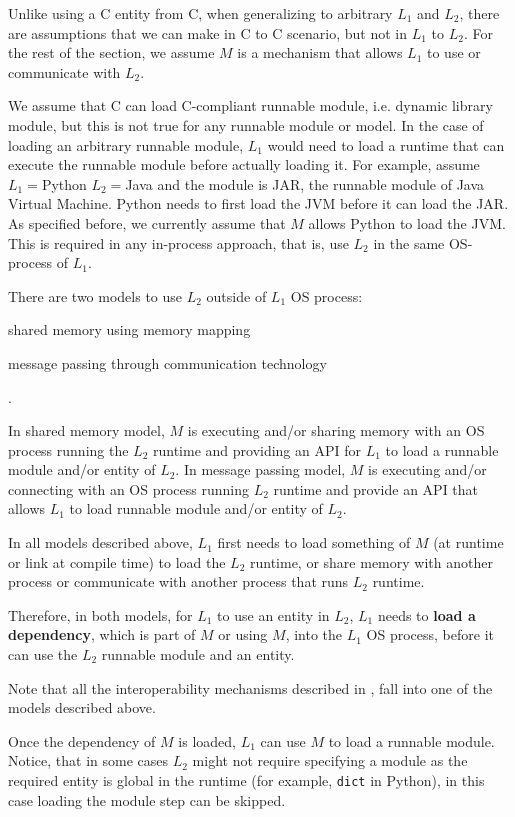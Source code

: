 \documentclass[sigplan,10pt,manuscript,nonacm]{acmart}
\begin{document}
Unlike using a C entity from C, when generalizing to arbitrary $L_1$ and $L_2$, there are assumptions that we can make in C to C scenario, but not in $L_1$ to $L_2$. For the rest of the section, we assume $M$ is a mechanism that allows $L_1$ to use or communicate with $L_2$.

We assume that C can load C-compliant runnable module, i.e. dynamic library module, but this is not true for any runnable module or model. In the case of loading an arbitrary runnable module, $L_1$ would need to load a runtime that can execute the runnable module before actually loading it. For example, assume $L_1=$Python $L_2=$Java and the module is JAR, the runnable module of Java Virtual Machine. Python needs to first load the JVM before it can load the JAR. As specified before, we currently assume that $M$ allows Python to load the JVM. This is required in any in-process approach, that is, use $L_2$ in the same OS-process of $L_1$.

There are two models to use $L_2$ outside of $L_1$ OS process: 
\begin{enumerate*}
\item shared memory using memory mapping
\item message passing through communication technology 
\end{enumerate*}.

In shared memory model, $M$ is executing and/or sharing memory with an OS process running the $L_2$ runtime and providing an API for $L_1$ to load a runnable module and/or entity of $L_2$. In message passing model, $M$ is executing and/or connecting with an OS process running $L_2$ runtime and provide an API that allows $L_1$ to load runnable module and/or entity of $L_2$. 

In all models described above, $L_1$ first needs to load something of $M$ (at runtime or link at compile time) to load the $L_2$ runtime, or share memory with another process or communicate with another process that runs $L_2$ runtime.

Therefore, in both models, for $L_1$ to use an entity in $L_2$, $L_1$ needs to \textbf{load a dependency}, which is part of $M$ or using $M$, into the $L_1$ OS process, before it can use the $L_2$ runnable module and an entity.

Note that all the interoperability mechanisms described in \cite{empirical_multi_lingual} \cite{toward_description_of_interop} \cite{polyfax}, fall into one of the models described above.

Once the dependency of $M$ is loaded, $L_1$ can use $M$ to load a runnable module. Notice, that in some cases $L_2$ might not require specifying a module as the required entity is global in the runtime (for example, \texttt{dict} in Python), in this case loading the module step can be skipped.
\end{document}
